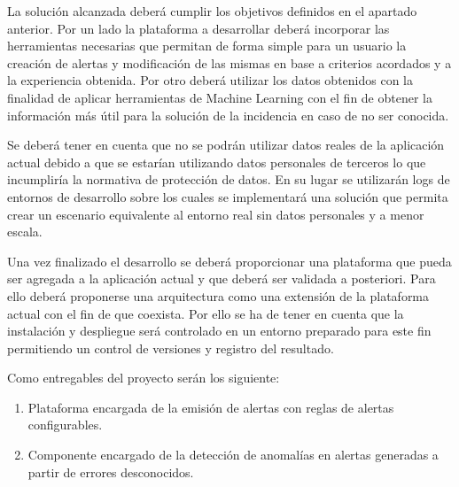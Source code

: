 La solución alcanzada deberá cumplir los objetivos definidos en el apartado anterior. Por un lado la plataforma a desarrollar deberá incorporar las herramientas necesarias que permitan de forma simple para un usuario la creación de alertas y modificación de las mismas en base a criterios acordados y a la experiencia obtenida. Por otro deberá utilizar los datos obtenidos con la finalidad de aplicar herramientas de Machine Learning con el fin de obtener la información más útil para la solución de la incidencia en caso de no ser conocida.

Se deberá tener en cuenta que no se podrán utilizar datos reales de la aplicación actual debido a que se estarían utilizando datos personales de terceros lo que incumpliría la normativa de protección de datos. En su lugar se utilizarán logs de entornos de desarrollo sobre los cuales se implementará una solución que permita crear un escenario equivalente al entorno real sin datos personales y a menor escala.

Una vez finalizado el desarrollo se deberá proporcionar una plataforma que pueda ser agregada a la aplicación actual y que deberá ser validada a posteriori. Para ello deberá proponerse una arquitectura como una extensión de la plataforma actual con el fin de que coexista. Por ello se ha de tener en cuenta que la instalación y despliegue será controlado en un entorno preparado para este fin permitiendo un control de versiones y registro del resultado.

Como entregables del proyecto serán los siguiente:

\begin{enumerate}
\item Plataforma encargada de la emisión de alertas con reglas de alertas configurables.
\item Componente encargado de la detección de anomalías en alertas generadas a partir de errores desconocidos.
\end{enumerate}